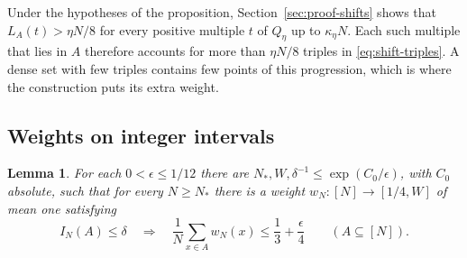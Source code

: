 \documentclass[11pt,reqno]{amsart}
\newtheorem{lemma}[theorem]{Lemma}
\numberwithin{equation}{section}
\begin{document}
Under the hypotheses of the proposition, Section~\ref{sec:proof-shifts}
shows that \(L_A(t)>\eta N/8\) for every positive multiple \(t\)
of \(Q_\eta\) up to \(\kappa_\eta N\). Each such multiple that lies in \(A\)
therefore accounts for more than \(\eta N/8\) triples in
\eqref{eq:shift-triples}. A dense set with few triples contains
few points of this progression, which is where the construction
puts its extra weight.

\subsection{Weights on integer intervals}

\begin{lemma}\label{lem:weights}
For each \(0<\epsilon\le1/12\) there are \(N_*,W,\delta^{-1}
\le \exp(C_0/\epsilon)\), with \(C_0\) absolute, such that for
every \(N\ge N_*\) there is a weight \(w_N:[N]\to[1/4,W]\) of
mean one satisfying
\begin{equation}\label{eq:weight-cert}
 I_N(A)\le\delta
 \quad\Longrightarrow\quad
 \frac1N\sum_{x\in A}w_N(x)\le\frac13+\frac{\epsilon}{4}
 \qquad(A\subseteq[N]).
\end{equation}
\end{lemma}
\end{document}
